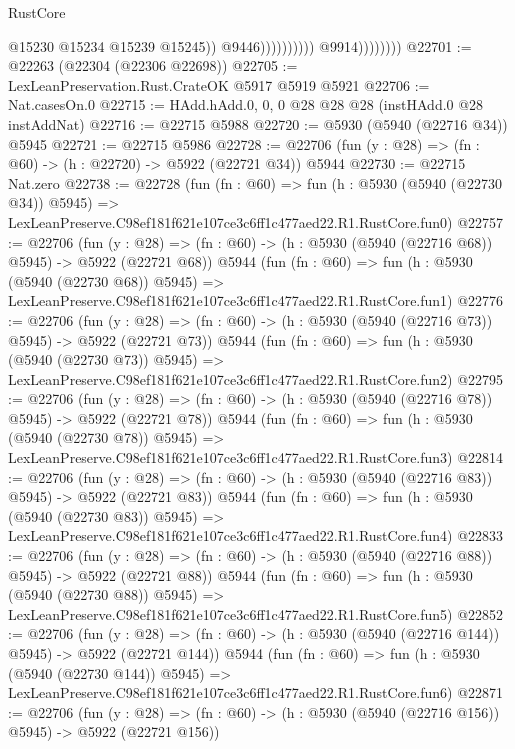 \begin{lexlean}{RustCore}
\begin{coremodule}
                                            @15230
                                            @15234
                                            @15239
                                            @15245))
                                        @9446))))))))))
                    @9914))))))))
@22701 := @22263 (@22304 (@22306 @22698))
@22705 := LexLeanPreservation.Rust.CrateOK @5917 @5919 @5921
@22706 := Nat.casesOn.{0}
@22715 := HAdd.hAdd.{0, 0, 0} @28 @28 @28 (instHAdd.{0} @28 instAddNat)
@22716 := @22715 @5988
@22720 := @5930 (@5940 (@22716 @34)) @5945
@22721 := @22715 @5986
@22728 := @22706 (fun (y : @28) => (fn : @60) -> (h : @22720) -> @5922 (@22721 @34)) @5944
@22730 := @22715 Nat.zero
@22738 := @22728
    (fun (fn : @60) =>
    fun (h : @5930 (@5940 (@22730 @34)) @5945) =>
    LexLeanPreserve.C98ef181f621e107ce3c6ff1c477aed22.R1.RustCore.fun0)
@22757 := @22706
    (fun (y : @28) => (fn : @60) -> (h : @5930 (@5940 (@22716 @68)) @5945) -> @5922 (@22721 @68))
    @5944
    (fun (fn : @60) =>
    fun (h : @5930 (@5940 (@22730 @68)) @5945) =>
    LexLeanPreserve.C98ef181f621e107ce3c6ff1c477aed22.R1.RustCore.fun1)
@22776 := @22706
    (fun (y : @28) => (fn : @60) -> (h : @5930 (@5940 (@22716 @73)) @5945) -> @5922 (@22721 @73))
    @5944
    (fun (fn : @60) =>
    fun (h : @5930 (@5940 (@22730 @73)) @5945) =>
    LexLeanPreserve.C98ef181f621e107ce3c6ff1c477aed22.R1.RustCore.fun2)
@22795 := @22706
    (fun (y : @28) => (fn : @60) -> (h : @5930 (@5940 (@22716 @78)) @5945) -> @5922 (@22721 @78))
    @5944
    (fun (fn : @60) =>
    fun (h : @5930 (@5940 (@22730 @78)) @5945) =>
    LexLeanPreserve.C98ef181f621e107ce3c6ff1c477aed22.R1.RustCore.fun3)
@22814 := @22706
    (fun (y : @28) => (fn : @60) -> (h : @5930 (@5940 (@22716 @83)) @5945) -> @5922 (@22721 @83))
    @5944
    (fun (fn : @60) =>
    fun (h : @5930 (@5940 (@22730 @83)) @5945) =>
    LexLeanPreserve.C98ef181f621e107ce3c6ff1c477aed22.R1.RustCore.fun4)
@22833 := @22706
    (fun (y : @28) => (fn : @60) -> (h : @5930 (@5940 (@22716 @88)) @5945) -> @5922 (@22721 @88))
    @5944
    (fun (fn : @60) =>
    fun (h : @5930 (@5940 (@22730 @88)) @5945) =>
    LexLeanPreserve.C98ef181f621e107ce3c6ff1c477aed22.R1.RustCore.fun5)
@22852 := @22706
    (fun (y : @28) => (fn : @60) -> (h : @5930 (@5940 (@22716 @144)) @5945) -> @5922 (@22721 @144))
    @5944
    (fun (fn : @60) =>
    fun (h : @5930 (@5940 (@22730 @144)) @5945) =>
    LexLeanPreserve.C98ef181f621e107ce3c6ff1c477aed22.R1.RustCore.fun6)
@22871 := @22706
    (fun (y : @28) => (fn : @60) -> (h : @5930 (@5940 (@22716 @156)) @5945) -> @5922 (@22721 @156))

\end{coremodule}
\end{lexlean}

